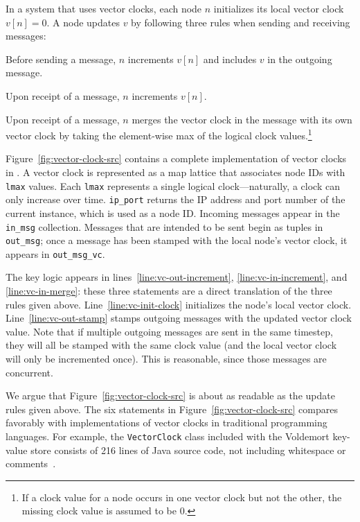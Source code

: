 In a system that uses vector clocks, each node $n$ initializes its local vector
clock $v[n] = 0$. A node updates $v$ by following three rules when sending and
receiving messages:
\begin{compactenum}
\item
  Before sending a message, $n$ increments $v[n]$ and includes $v$ in the
  outgoing message.
\item
  Upon receipt of a message, $n$ increments $v[n]$.
\item
  Upon receipt of a message, $n$ merges the vector clock in the message with its
  own vector clock by taking the element-wise max of the logical clock
  values.\footnote{If a clock value for a node occurs in one vector clock but
    not the other, the missing clock value is assumed to be $0$.}
\end{compactenum}
Figure~\ref{fig:vector-clock-src} contains a complete implementation of vector
clocks in \lang. A vector clock is represented as a map lattice that associates
node IDs with \texttt{lmax} values. Each \texttt{lmax} represents a single
logical clock---naturally, a clock can only increase over time.
\texttt{ip\_port} returns the IP address and port number of the current \lang
instance, which is used as a node ID. Incoming messages appear in the
\texttt{in\_msg} collection. Messages that are intended to be sent begin as
tuples in \texttt{out\_msg}; once a message has been stamped with the local
node's vector clock, it appears in \texttt{out\_msg\_vc}.

The key logic appears in lines~\ref{line:vc-out-increment},
\ref{line:vc-in-increment}, and \ref{line:vc-in-merge}: these three statements
are a direct translation of the three rules given
above. Line~\ref{line:vc-init-clock} initializes the node's local vector clock.
Line~\ref{line:vc-out-stamp} stamps outgoing messages with the updated vector
clock value.  Note that if multiple outgoing messages are sent in the same \lang
timestep, they will all be stamped with the same clock value (and the local
vector clock will only be incremented once). This is reasonable, since those
messages are concurrent.

We argue that Figure~\ref{fig:vector-clock-src} is about as readable as the
update rules given above. The six \lang statements in
Figure~\ref{fig:vector-clock-src} compares favorably with implementations of
vector clocks in traditional programming languages. For example, the
\texttt{VectorClock} class included with the Voldemort key-value store consists
of 216 lines of Java source code, not including whitespace or
comments~\cite{voldemort-vector-clock}.


